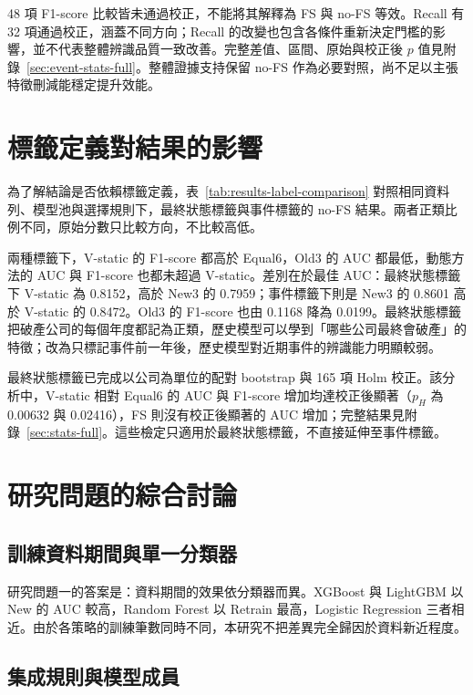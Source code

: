 48 項 F1-score 比較皆未通過校正，不能將其解釋為 FS 與 no-FS 等效。Recall 有 32 項通過校正，涵蓋不同方向；Recall 的改變也包含各條件重新決定門檻的影響，並不代表整體辨識品質一致改善。完整差值、區間、原始與校正後 \(p\) 值見附錄~\ref{sec:event-stats-full}。整體證據支持保留 no-FS 作為必要對照，尚不足以主張特徵刪減能穩定提升效能。

\section{標籤定義對結果的影響}\label{sec:results-label}

為了解結論是否依賴標籤定義，表~\ref{tab:results-label-comparison} 對照相同資料列、模型池與選擇規則下，最終狀態標籤與事件標籤的 no-FS 結果。兩者正類比例不同，原始分數只比較方向，不比較高低。



兩種標籤下，V-static 的 F1-score 都高於 Equal6，Old3 的 AUC 都最低，動態方法的 AUC 與 F1-score 也都未超過 V-static。差別在於最佳 AUC：最終狀態標籤下 V-static 為 0.8152，高於 New3 的 0.7959；事件標籤下則是 New3 的 0.8601 高於 V-static 的 0.8472。Old3 的 F1-score 也由 0.1168 降為 0.0199。最終狀態標籤把破產公司的每個年度都記為正類，歷史模型可以學到「哪些公司最終會破產」的特徵；改為只標記事件前一年後，歷史模型對近期事件的辨識能力明顯較弱。

最終狀態標籤已完成以公司為單位的配對 bootstrap 與 165 項 Holm 校正。該分析中，V-static 相對 Equal6 的 AUC 與 F1-score 增加均達校正後顯著（\(p_H\) 為 0.00632 與 0.02416），FS 則沒有校正後顯著的 AUC 增加；完整結果見附錄~\ref{sec:stats-full}。這些檢定只適用於最終狀態標籤，不直接延伸至事件標籤。

\section{研究問題的綜合討論}\label{sec:results-discussion}

\subsection{訓練資料期間與單一分類器}

研究問題一的答案是：資料期間的效果依分類器而異。XGBoost 與 LightGBM 以 New 的 AUC 較高，Random Forest 以 Retrain 最高，Logistic Regression 三者相近。由於各策略的訓練筆數同時不同，本研究不把差異完全歸因於資料新近程度。

\subsection{集成規則與模型成員}

